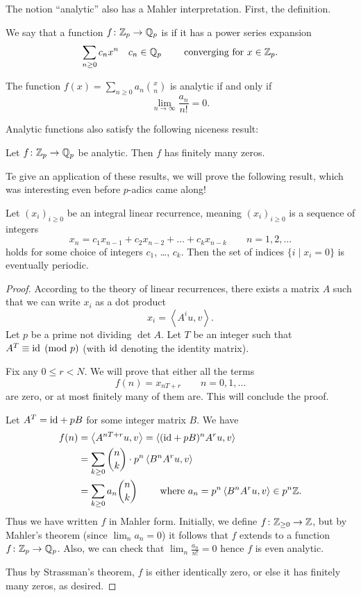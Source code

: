 The notion ``analytic'' also has a Mahler interpretation.
First, the definition.
\begin{definition}
We say that a function $f \colon \mathbb Z_p \to \mathbb Q_p$ is 
if it has a power series expansion
\[ \sum_{n \ge 0} c_n x^n \quad c_n \in \mathbb Q_p
	\qquad\text{ converging for } x \in \mathbb Z_p. \]
\end{definition}
\begin{theorem}
	The function $f(x) = \sum_{n \ge 0} a_n \binom xn$ is analytic
	if and only if
	\[ \lim_{n \to \infty} \frac{a_n}{n!} = 0. \]
\end{theorem}
Analytic functions also satisfy the following niceness result:
\begin{theorem}
	Let $f \colon \mathbb Z_p \to \mathbb Q_p$ be analytic.
	Then $f$ has finitely many zeros.
\end{theorem}

Te give an application of these results,
we will prove the following result,
which was interesting even before $p$-adics came along!
\begin{theorem}
	Let $(x_i)_{i \ge 0}$ be an integral linear recurrence,
	meaning $(x_i)_{i \ge 0}$ is a sequence of integers
	\[ x_n = c_1 x_{n-1} + c_2 x_{n-2} + \dots + c_k x_{n-k}
		\qquad n = 1, 2, \dots \]
	holds for some choice of integers $c_1$, \dots, $c_k$.
	Then the set of indices $\{ i \mid x_i = 0 \}$
	is eventually periodic.
\end{theorem}

\begin{proof}
	According to the theory of linear recurrences,
	there exists a matrix $A$ such that we can write
	$x_i$ as a dot product
	\[ x_i = \left< A^i u, v \right>. \]
	Let $p$ be a prime not dividing $\det A$.
	Let $T$ be an integer such that $A^T \equiv \mathrm{id} \pmod p$
	(with $\mathrm{id}$ denoting the identity matrix).

	Fix any $0 \le r < N$.
	We will prove that either all the terms
	\[ f(n) = x_{nT+r} \qquad n = 0, 1, \dots \]
	are zero, or at most finitely many of them are.
	This will conclude the proof.

	Let $A^T = \mathrm{id} + pB$ for some integer matrix $B$.
	We have
	\begin{align*}
		f(n) &= \left< A^{nT+r} u, v \right>
		= \left< (\mathrm{id} + pB)^n A^r u, v \right> \\
		&= \sum_{k \ge 0} \binom nk \cdot p^n \left< B^n A^r u, v \right> \\
		&= \sum_{k \ge 0} a_n \binom nk \qquad \text{ where }
			a_n = p^n \left< B^n A^r u, v \right> \in p^n \mathbb Z.
	\end{align*}
	Thus we have written $f$ in Mahler form.
	Initially, we define $f \colon \mathbb Z_{\ge 0} \to \mathbb Z$,
	but by Mahler's theorem (since $\lim_n a_n = 0$)
	it follows that $f$ extends to a function $f \colon \mathbb Z_p \to \mathbb Q_p$.
	Also, we can check that $\lim_n \frac{a_n}{n!} = 0$
	hence $f$ is even analytic.

	Thus by Strassman's theorem, $f$ is either identically zero,
	or else it has finitely many zeros, as desired.
\end{proof}

